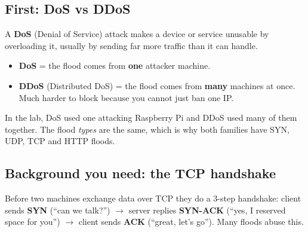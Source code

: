 \documentclass[11pt]{article}
\begin{document}
\subsection*{First: DoS vs DDoS}
A \textbf{DoS} (Denial of Service) attack makes a device or service unusable by overloading it, usually by sending far more traffic than it can handle.
\begin{itemize}
\item \textbf{DoS} = the flood comes from \textbf{one} attacker machine.
\item \textbf{DDoS} (Distributed DoS) = the flood comes from \textbf{many} machines at once. Much harder to block because you cannot just ban one IP.
\end{itemize}
In the lab, DoS used one attacking Raspberry Pi and DDoS used many of them together. The flood \emph{types} are the same, which is why both families have SYN, UDP, TCP and HTTP floods.

\subsection*{Background you need: the TCP handshake}
Before two machines exchange data over TCP they do a 3-step handshake:
client sends \textbf{SYN} (``can we talk?'') $\rightarrow$ server replies \textbf{SYN-ACK} (``yes, I reserved space for you'') $\rightarrow$ client sends \textbf{ACK} (``great, let's go'').
Many floods abuse this.
\end{document}
